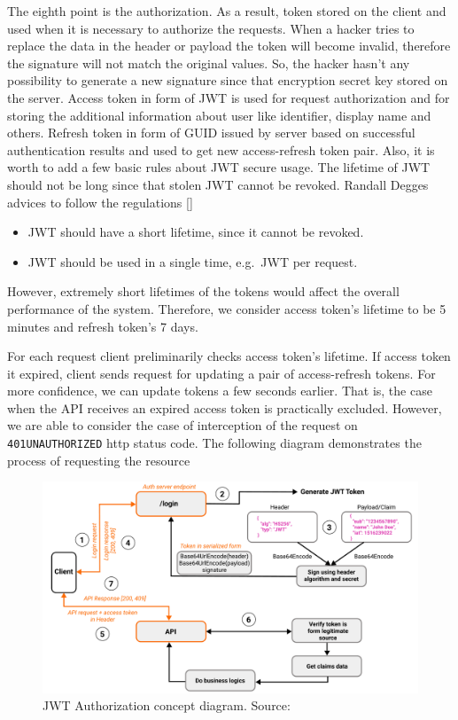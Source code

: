 The eighth point is the authorization.
As a result, token stored on the client and used when it is necessary to authorize the requests.
When a hacker tries to replace the data in the header or payload the token will become invalid,
therefore the signature will not match the original values.
So, the hacker hasn't any possibility to generate a new signature since that encryption secret key stored on the server.
Access token in form of JWT is used for request authorization and for storing the additional information
about user like identifier, display name and others.
Refresh token in form of GUID issued by server based on successful authentication results and used
to get new access-refresh token pair.
Also, it is worth to add a few basic rules about JWT secure usage.
The lifetime of JWT should not be long since that stolen JWT cannot be revoked.
Randall Degges advices to follow the regulations [\cite{RDegges}]
\begin{itemize}
    \item JWT should have a short lifetime, since it cannot be revoked.
    \item JWT should be used in a single time, e.g.\ JWT per request.
\end{itemize}
However, extremely short lifetimes of the tokens would affect the overall performance of the system.
Therefore, we consider access token's lifetime to be 5 minutes and refresh token's 7 days.

For each request client preliminarily checks access token's lifetime.
If access token it expired, client sends request for updating a pair of access-refresh tokens.
For more confidence, we can update tokens a few seconds earlier.
That is, the case when the API receives an expired access token is practically excluded.
However, we are able to consider the case of interception of the request on \texttt{401UNAUTHORIZED} http status code.
The following diagram demonstrates the process of requesting the resource

\begin{figure}[H]
    \centering
    \includegraphics[width=1\textwidth]{Pictures/06_JWT_authorization_concept_diagram}
    \caption{JWT Authorization concept diagram. Source: }\label{fig:figure3}
\end{figure}


